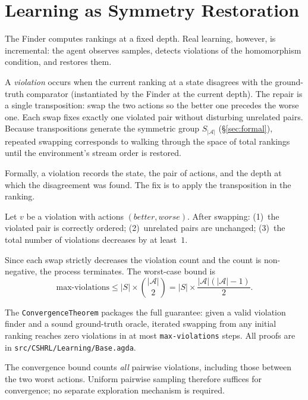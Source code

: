 \documentclass[runningheads]{llncs}
\newcommand{\fpath}[1]{\nolinkurl{#1}}
\begin{document}
\section{Learning as Symmetry Restoration}\label{sec:learning}

The Finder computes rankings at a fixed depth. Real learning, however, is incremental: the agent observes samples, detects violations of the homomorphism condition, and restores them.

A \emph{violation} occurs when the current ranking at a state disagrees with the ground-truth comparator (instantiated by the Finder at the current depth). The repair is a single transposition: swap the two actions so the better one precedes the worse one. Each swap fixes exactly one violated pair without disturbing unrelated pairs. Because transpositions generate the symmetric group $S_{|\mathcal{A}|}$ (\S\ref{sec:formal}), repeated swapping corresponds to walking through the space of total rankings until the environment's stream order is restored.

Formally, a violation records the state, the pair of actions, and the depth at which the disagreement was found. The fix is to apply the transposition in the ranking.

\begin{theorem}
Let $v$ be a violation with actions $(\textit{better}, \textit{worse})$. After swapping: (1)~the violated pair is correctly ordered; (2)~unrelated pairs are unchanged; (3)~the total number of violations decreases by at least~$1$.
\end{theorem}

Since each swap strictly decreases the violation count and the count is non-negative, the process terminates. The worst-case bound is
\[
\text{max-violations} \leq |S| \times \binom{|\mathcal{A}|}{2} = |S| \times \frac{|\mathcal{A}|(|\mathcal{A}|-1)}{2}.
\]

The \texttt{ConvergenceTheorem} packages the full guarantee: given a valid violation finder and a sound ground-truth oracle, iterated swapping from any initial ranking reaches zero violations in at most \texttt{max-violations} steps. All proofs are in \fpath{src/CSHRL/Learning/Base.agda}.

\begin{remark}\label{rem:exploration}
The convergence bound counts \emph{all} pairwise violations, including those between the two worst actions. Uniform pairwise sampling therefore suffices for convergence; no separate exploration mechanism is required.
\end{remark}
\end{document}
